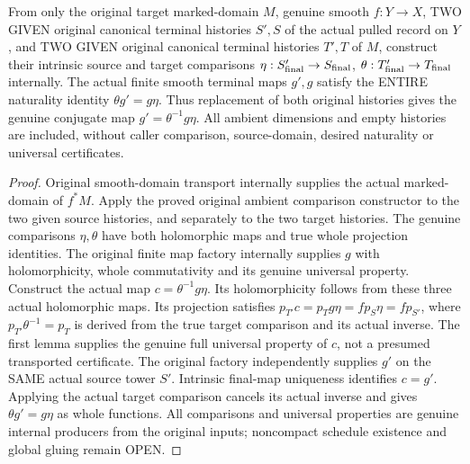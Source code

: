 \begin{theorem}
\label{hir:smooth-original-terminal-independent-history-naturality}
\leanok
{}
From only the original target marked-domain $M$, genuine smooth
$f:Y\to X$, TWO GIVEN original canonical terminal histories $S',S$
of the actual pulled record on $Y$, and TWO GIVEN original canonical
terminal histories $T',T$ of $M$, construct their intrinsic source and
target comparisons $\eta:S'_{\rm final}\to S_{\rm final}$,
$\theta:T'_{\rm final}\to T_{\rm final}$ internally. The actual
finite smooth terminal maps $g',g$ satisfy the ENTIRE naturality
identity $\theta g'=g\eta$. Thus replacement of both original
histories gives the genuine conjugate map
$g'=\theta^{-1}g\eta$. All ambient dimensions and empty histories
are included, without caller comparison, source-domain, desired
naturality or universal certificates.
\end{theorem}
\begin{proof}
Original smooth-domain transport internally supplies the actual
marked-domain of $f^*M$. Apply the proved original ambient comparison
constructor to the two given source histories, and separately to the
two target histories. The genuine comparisons $\eta,\theta$ have
both holomorphic maps and true whole projection identities. The
original finite map factory internally supplies $g$ with holomorphicity,
whole commutativity and its genuine universal property. Construct the
actual map $c=\theta^{-1}g\eta$. Its holomorphicity follows from
these three actual holomorphic maps. Its projection satisfies
$p_{T'}c=p_Tg\eta=f p_S\eta=f p_{S'}$, where
$p_{T'}\theta^{-1}=p_T$ is derived from the true target comparison
and its actual inverse. The first lemma supplies the genuine full
universal property of $c$, not a presumed transported certificate.
The original factory independently supplies $g'$ on the SAME actual
source tower $S'$. Intrinsic final-map uniqueness identifies $c=g'$.
Applying the actual target comparison cancels its actual inverse and
gives $\theta g'=g\eta$ as whole functions. All comparisons and
universal properties are genuine internal producers from the original
inputs; noncompact schedule existence and global gluing remain OPEN.
\end{proof}
